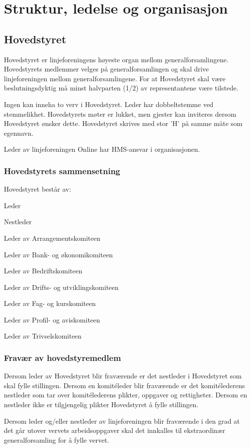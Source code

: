 \chapter{Struktur, ledelse og organisasjon}
\section{Hovedstyret}
Hovedstyret er linjeforeningens høyeste organ mellom generalforsamlingene. Hovedstyrets medlemmer velges på generalforsamlingen og skal drive linjeforeningen mellom generalforsamlingene. For at Hovedstyret skal være beslutningsdyktig må minst halvparten (1/2) av representantene være tilstede.

Ingen kan inneha to verv i Hovedstyret. Leder har dobbeltstemme ved stemmelikhet. Hovedstyrets møter er lukket, men gjester kan inviteres dersom Hovedstyret ønsker dette. Hovedstyret skrives med stor ’H’ på samme måte som egennavn.

Leder av linjeforeningen Online har HMS-ansvar i organisasjonen. 


\subsection{Hovedstyrets sammensetning}{
Hovedstyret består av:
\begin{liste}
	\item Leder
	\item Nestleder
	\item Leder av Arrangementskomiteen
	\item Leder av Bank- og økonomikomiteen
	\item Leder av Bedriftskomiteen
	\item Leder av Drifts- og utviklingskomiteen
	\item Leder av Fag- og kurskomiteen
	\item Leder av Profil- og aviskomiteen
	\item Leder av Trivselskomiteen
\end{liste}
}


\subsection{Fravær av hovedstyremedlem}{
Dersom leder av Hovedstyret blir fraværende er det nestleder i Hovedstyret som skal fylle stillingen. Dersom en komitéleder blir fraværende er det komitélederens nestleder som tar over komitélederens plikter, oppgaver og rettigheter. Dersom en nestleder ikke er tilgjengelig plikter Hovedstyret å fylle stillingen. 

Dersom leder og/eller nestleder av linjeforeningen blir fraværende i den grad at det går utover vervets arbeidsoppgaver skal det innkalles til ekstraordinær generalforsamling for å fylle vervet.
}
